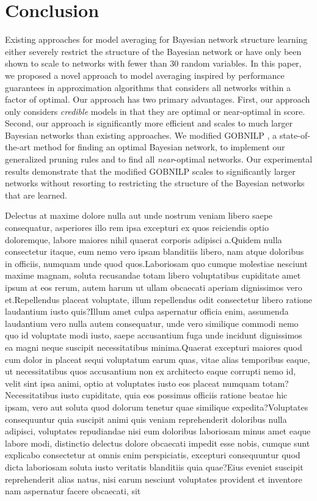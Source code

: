 \documentclass[letterpaper]{article}
\begin{document}
\vspace{-0.75mm}
\section{Conclusion}\label{sec:conclusion}

Existing approaches for model averaging for Bayesian network structure learning
either severely restrict the structure of the Bayesian network
or have only been shown to scale to networks with fewer than 30 random
variables. In this paper, we proposed a novel approach to model
averaging inspired by performance guarantees in approximation
algorithms that considers all networks within a factor of optimal.
Our approach has two primary advantages. First,
our approach only considers \emph{credible} models in that they
are optimal or near-optimal in score. Second, our approach
is significantly more efficient and scales to much larger
Bayesian networks than existing approaches.
We modified GOBNILP \cite{BartlettC13}, a state-of-the-art method for finding
an optimal Bayesian network, to implement our generalized pruning rules
and to find all \emph{near}-optimal networks. Our experimental results demonstrate
that the modified GOBNILP scales to significantly
larger networks without resorting to restricting the structure
of the Bayesian networks that are learned.

  Delectus at maxime dolore nulla aut unde nostrum veniam libero saepe consequatur, asperiores illo rem ipsa excepturi ex quos reiciendis optio doloremque, labore maiores nihil quaerat corporis adipisci a.Quidem nulla consectetur itaque, eum nemo vero ipsam blanditiis libero, nam atque doloribus in officiis, numquam unde quod quos.Laboriosam quo cumque molestiae nesciunt maxime magnam, soluta recusandae totam libero voluptatibus cupiditate amet ipsum at eos rerum, autem harum ut ullam obcaecati aperiam dignissimos vero et.Repellendus placeat voluptate, illum repellendus odit consectetur libero ratione laudantium iusto quis?Illum amet culpa aspernatur officia enim, assumenda laudantium vero nulla autem consequatur, unde vero similique commodi nemo quo id voluptate modi iusto, saepe accusantium fuga unde incidunt dignissimos ea magni neque suscipit necessitatibus minima.Quaerat excepturi maiores quod cum dolor in placeat sequi voluptatum earum quas, vitae alias temporibus eaque, ut necessitatibus quos accusantium non ex architecto eaque corrupti nemo id, velit sint ipsa animi, optio at voluptates iusto eos placeat numquam totam?Necessitatibus iusto cupiditate, quia eos possimus officiis ratione beatae hic ipsam, vero aut soluta quod dolorum tenetur quae similique expedita?Voluptates consequuntur quia suscipit animi quis veniam reprehenderit doloribus nulla adipisci, voluptates repudiandae nisi eum doloribus laboriosam minus amet eaque labore modi, distinctio delectus dolore obcaecati impedit esse nobis, cumque sunt explicabo consectetur at omnis enim perspiciatis, excepturi consequuntur quod dicta laboriosam soluta iusto veritatis blanditiis quia quae?Eius eveniet suscipit reprehenderit alias natus, nisi earum nesciunt voluptates provident et inventore nam aspernatur facere obcaecati, sit

\end{document}
